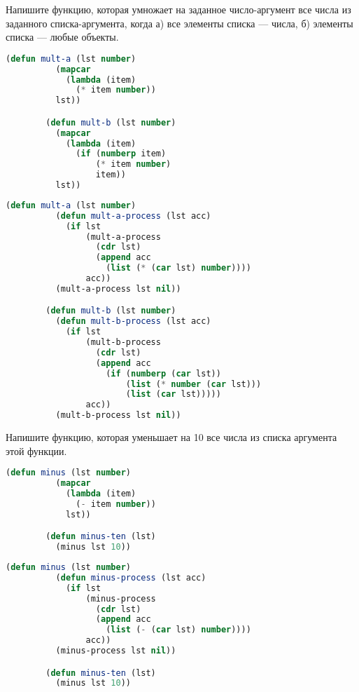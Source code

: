 \documentclass[a4paper,oneside,12pt]{extreport}
\begin{document}
\begin{task}
	Напишите функцию, которая умножает на заданное число-аргумент все числа из заданного списка-аргумента, когда а) все элементы списка — числа, б)  элементы списка — любые объекты.

	\begin{lstlisting}[language=Lisp, gobble=16]
		(defun mult-a (lst number)
		  (mapcar
		    (lambda (item)
		      (* item number))
		  lst))

		(defun mult-b (lst number)
		  (mapcar
		    (lambda (item)
		      (if (numberp item)
		          (* item number)
		          item))
		  lst))
	\end{lstlisting}

	\begin{lstlisting}[language=Lisp, gobble=16]
		(defun mult-a (lst number)
		  (defun mult-a-process (lst acc)
		    (if lst
		        (mult-a-process
		          (cdr lst)
		          (append acc
		            (list (* (car lst) number))))
		        acc))
		  (mult-a-process lst nil))

		(defun mult-b (lst number)
		  (defun mult-b-process (lst acc)
		    (if lst
		        (mult-b-process
		          (cdr lst)
		          (append acc
		            (if (numberp (car lst))
		                (list (* number (car lst)))
		                (list (car lst)))))
		        acc))
		  (mult-b-process lst nil))
	\end{lstlisting}
\end{task}

\begin{task}
	Напишите функцию, которая уменьшает на 10 все числа из списка аргумента этой функции.

	\begin{lstlisting}[language=Lisp, gobble=16]
		(defun minus (lst number)
		  (mapcar
		    (lambda (item)
		      (- item number))
		    lst))

		(defun minus-ten (lst)
		  (minus lst 10))
	\end{lstlisting}

	\begin{lstlisting}[language=Lisp, gobble=16]
		(defun minus (lst number)
		  (defun minus-process (lst acc)
		    (if lst
		        (minus-process
		          (cdr lst)
		          (append acc
		            (list (- (car lst) number))))
		        acc))
		  (minus-process lst nil))

		(defun minus-ten (lst)
		  (minus lst 10))
	\end{lstlisting}
\end{task}
\end{document}
